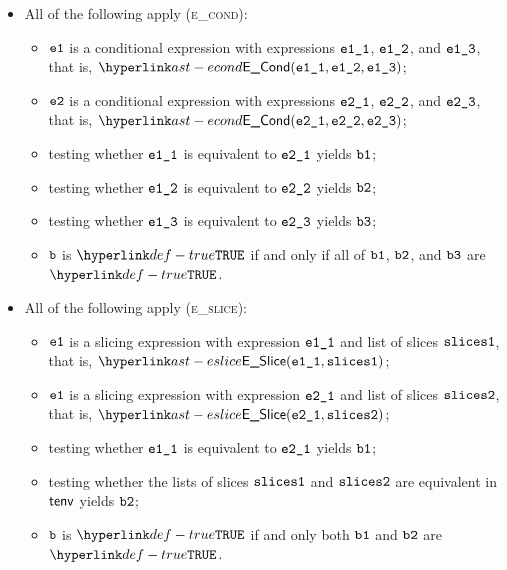 \begin{itemize}
  \item All of the following apply (\textsc{e\_cond}):
  \begin{itemize}
    \item $\texttt{e1}$ is a conditional expression with expressions $\texttt{e1\_1}$, $\texttt{e1\_2}$, and $\texttt{e1\_3}$,
          that is, $\ECond(\veoneone, \veonetwo, \veonethree)$;
    \item $\texttt{e2}$ is a conditional expression with expressions $\texttt{e2\_1}$, $\texttt{e2\_2}$, and $\texttt{e2\_3}$,
          that is, $\ECond(\vetwoone, \vetwotwo, \vetwothree)$;
    \item testing whether $\texttt{e1\_1}$ is equivalent to $\texttt{e2\_1}$ yields $\texttt{b1}$\ProseOrTypeError;
    \item testing whether $\texttt{e1\_2}$ is equivalent to $\texttt{e2\_2}$ yields $\texttt{b2}$\ProseOrTypeError;
    \item testing whether $\texttt{e1\_3}$ is equivalent to $\texttt{e2\_3}$ yields $\texttt{b3}$\ProseOrTypeError;
    \item $\texttt{b}$ is $\True$ if and only if all of $\texttt{b1}$, $\texttt{b2}$, and $\texttt{b3}$ are $\True$.
  \end{itemize}

  \item All of the following apply (\textsc{e\_slice}):
  \begin{itemize}
    \item $\texttt{e1}$ is a slicing expression with expression $\texttt{e1\_1}$ and list of slices $\texttt{slices1}$,
          that is, $\ESlice(\veoneone, \slicesone)$;
    \item $\texttt{e1}$ is a slicing expression with expression $\texttt{e2\_1}$ and list of slices $\texttt{slices2}$,
          that is, $\ESlice(\vetwoone, \slicestwo)$;
    \item testing whether $\texttt{e1\_1}$ is equivalent to $\texttt{e2\_1}$ yields $\texttt{b1}$\ProseOrTypeError;
    \item testing whether the lists of slices $\texttt{slices1}$ and $\texttt{slices2}$ are equivalent in $\textsf{tenv}$ yields $\texttt{b2}$\ProseOrTypeError;
    \item $\texttt{b}$ is $\True$ if and only both $\texttt{b1}$ and $\texttt{b2}$ are $\True$.
  \end{itemize}


\end{itemize}
